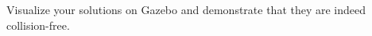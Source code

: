 \question{[10]}

Visualize your solutions on Gazebo and demonstrate that they are indeed
collision-free.